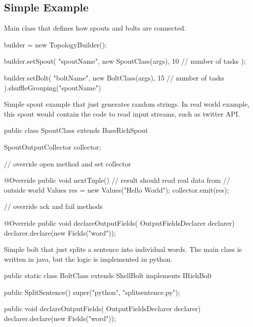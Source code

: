 \documentclass[journal]{IEEEtran/IEEEtran}
\begin{document}
\subsection{Simple Example}

Main class that defines how spouts and bolts are connected.

\begin{code}
     
    builder = new TopologyBuilder();

    builder.setSpout(
        "spoutName",
        new SpoutClass(args),
        10 // number of tasks
    );

    builder.setBolt(
        "boltName",
        new BoltClass(args),
        15 // number of tasks
    ).shuffleGrouping("spoutName")

\end{code}

Simple spout example that just generates random strings. In real world example, this spout would contain the code to read input streams, such as twitter API.

\begin{code}

public class SpoutClass extends BaseRichSpout {
    SpoutOutputCollector collector;

    // override open method and set collector

    @Override
    public void nextTuple() {
        // result should read real data from
        // outside world
        Values res = new Values("Hello World");
        collector.emit(res);
    }

    // override ack and fail methods

    @Override
    public void declareOutputFields(
            OutputFieldsDeclarer declarer) {
        declarer.declare(new Fields("word"));
    }
    
}

\end{code}

Simple bolt that just splits a sentence into individual words. The main class is written in java, but the logic is implemented in python. 

\begin{code}

public static class BoltClass 
        extends ShellBolt 
        implements IRichBolt {
    
    public SplitSentence() {
        super("python", "splitsentence.py");
    }

    public void declareOutputFields(
            OutputFieldsDeclarer declarer) {
        declarer.declare(new Fields("word"));
    }
}

\end{code}
\end{document}
